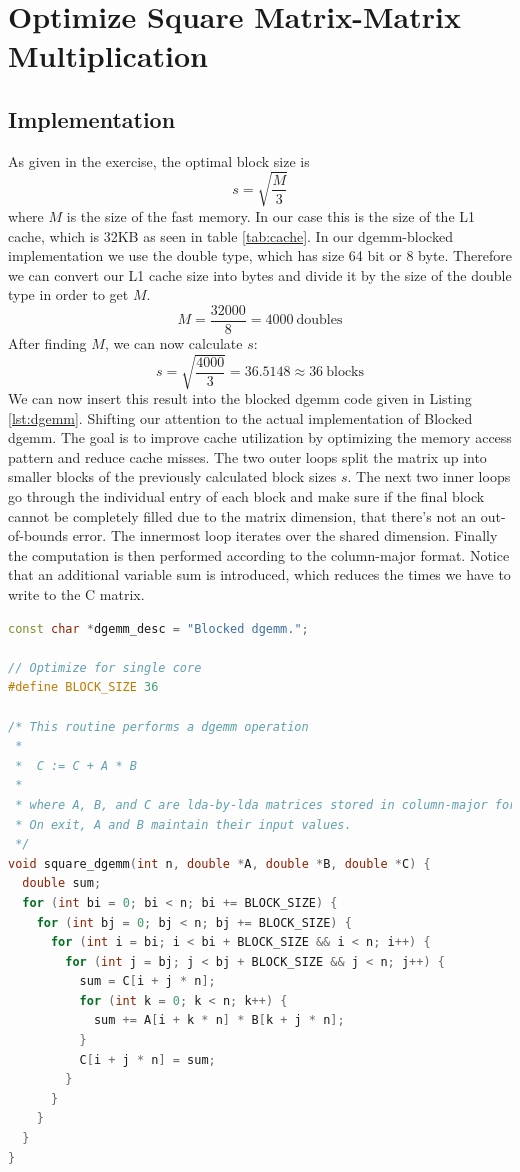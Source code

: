 \section{Optimize Square Matrix-Matrix Multiplication  }
\subsection{Implementation}
As given in the exercise, the optimal block size is
\begin{equation}
	s = \sqrt{\frac{M}{3}}
\end{equation}
where $M$ is the size of the fast memory. In our case this is the size of the L1 cache, which is 32KB as seen in table \ref{tab:cache}. In our dgemm-blocked implementation we use the double type, which has size 64 bit or 8 byte. Therefore we can convert our L1 cache size into bytes and divide it by the size of the double type in order to get $M$.
\begin{equation}
	M = \frac{32000}{8} = 4000 \ \text{doubles}
\end{equation}
After finding $M$, we can now calculate $s$:
\begin{equation}
	s = \sqrt{\frac{4000}{3}} = 36.5148 \approx 36 \ \text{blocks}
\end{equation}
We can now insert this result into the blocked dgemm code given in Listing \ref{lst:dgemm}.
Shifting our attention to the actual implementation of Blocked dgemm.
The goal is to improve cache utilization by optimizing the memory access pattern and reduce cache misses.\newline
The two outer loops split the matrix up into smaller blocks of the previously calculated block sizes $s$.
The next two inner loops go through the individual entry of each block and make sure if the final block cannot be completely filled due to the matrix dimension, that there's not an out-of-bounds error. The innermost loop iterates over the shared dimension.
Finally the computation is then performed according to the column-major format. 
Notice that an additional variable sum is introduced, which reduces the times we have to write to the C matrix.
\begin{lstlisting}[language=C++, caption=Dgemm blocked, label=lst:dgemm]
 const char *dgemm_desc = "Blocked dgemm.";

// Optimize for single core
#define BLOCK_SIZE 36

/* This routine performs a dgemm operation
 *
 *  C := C + A * B
 *
 * where A, B, and C are lda-by-lda matrices stored in column-major format.
 * On exit, A and B maintain their input values.
 */
void square_dgemm(int n, double *A, double *B, double *C) {
  double sum;
  for (int bi = 0; bi < n; bi += BLOCK_SIZE) {
    for (int bj = 0; bj < n; bj += BLOCK_SIZE) {
      for (int i = bi; i < bi + BLOCK_SIZE && i < n; i++) {
        for (int j = bj; j < bj + BLOCK_SIZE && j < n; j++) {
          sum = C[i + j * n];
          for (int k = 0; k < n; k++) {
            sum += A[i + k * n] * B[k + j * n];
          }
          C[i + j * n] = sum;
        }
      }
    }
  }
}
 \end{lstlisting}

